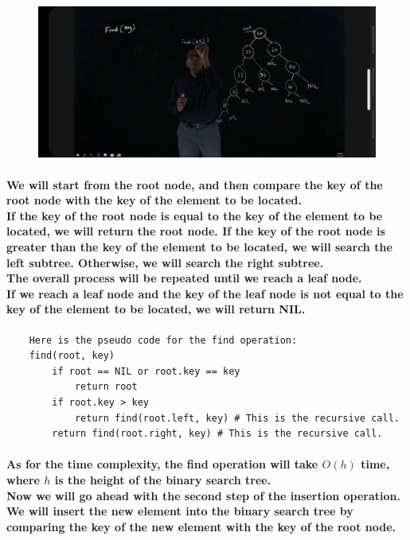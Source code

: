 \documentclass{article}
\begin{document}
\begin{figure}[H]
    \includegraphics[width=\textwidth]{binarysearchtreeinsertion.jpg}
\end{figure}

\paragraph{
    We will start from the root node, and then compare the key of the root node with the key of the element to be located.\\
    If the key of the root node is equal to the key of the element to be located, we will return the root node. 
    If the key of the root node is greater than the key of the element to be located, we will search the left subtree. 
    Otherwise, we will search the right subtree.\\
    The overall process will be repeated until we reach a leaf node.\\
    If we reach a leaf node and the key of the leaf node is not equal to the key of the element to be located, we will return NIL.\\
}

\begin{verbatim}
    Here is the pseudo code for the find operation:
    find(root, key)
        if root == NIL or root.key == key
            return root
        if root.key > key
            return find(root.left, key) # This is the recursive call.
        return find(root.right, key) # This is the recursive call.
\end{verbatim}

\paragraph{
    As for the time complexity, the find operation will take $O(h)$ time, where $h$ is the height of the binary search tree.\\
    Now we will go ahead with the second step of the insertion operation.\\
    We will insert the new element into the binary search tree by comparing the key of the new element with the key of the root node.\\
    }
\end{document}
